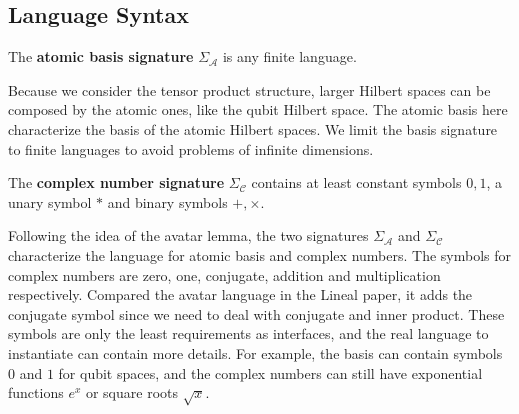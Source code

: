 \documentclass[manuscript, review, timestamp]{acmart}
\begin{document}
\subsection{Language Syntax}

\begin{definition} 
  The \textbf{atomic basis signature} $\Sigma_\mathcal{A}$ is any finite language.
\end{definition}

Because we consider the tensor product structure, larger Hilbert spaces can be composed by the atomic ones, like the qubit Hilbert space. The atomic basis here characterize the basis of the atomic Hilbert spaces.
We limit the basis signature to finite languages to avoid problems of infinite dimensions.

\begin{definition} 
  The \textbf{complex number signature} $\Sigma_\mathcal{C}$ contains at least constant symbols $0, 1$, a unary symbol $*$ and binary symbols $+, \times$.
\end{definition}

Following the idea of the avatar lemma, the two signatures $\Sigma_\mathcal{A}$ and $\Sigma_\mathcal{C}$ characterize the language for atomic basis and complex numbers. 
The symbols for complex numbers are zero, one, conjugate, addition and multiplication respectively. Compared the avatar language in the Lineal paper\cite{Arrighi2017}, it adds the conjugate symbol since we need to deal with conjugate and inner product.
These symbols are only the least requirements as interfaces, and the real language to instantiate can contain more details. For example, the basis can contain symbols $0$ and $1$ for qubit spaces, and the complex numbers can still have exponential functions $e^x$ or square roots $\sqrt{x}$.
\end{document}
